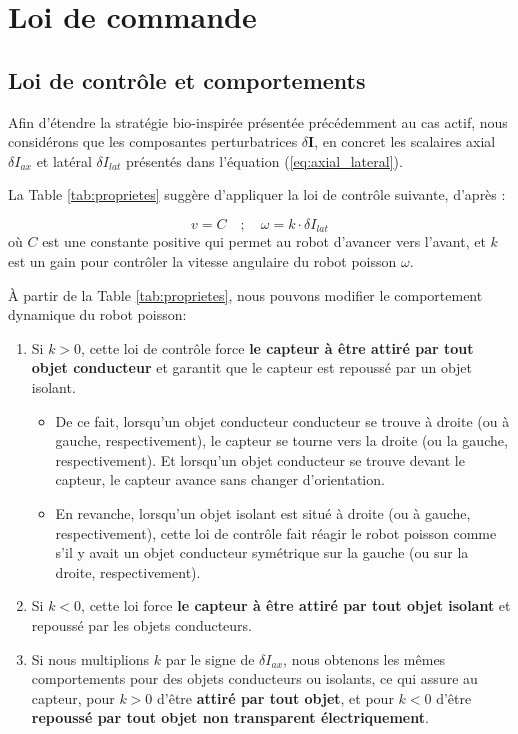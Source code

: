 \section{Loi de commande} 
\subsection{Loi de contrôle et comportements} \label{sec:controle}
Afin d'étendre la stratégie bio-inspirée présentée précédemment au cas actif, nous considérons que les composantes perturbatrices $\delta \mathbf{I}$, en concret les scalaires axial $\delta I_{ax}$ et latéral $\delta I_{lat}$ présentés dans l'équation (\ref{eq:axial_lateral}).

La Table \ref{tab:proprietes} suggère d'appliquer la loi de contrôle suivante, d'après \cite{Boyer2013}: 

\begin{equation}
    v = C \quad ; \quad \omega = k \cdot \delta I_{lat}
\end{equation}
où $C$ est une constante positive qui permet au robot d'avancer vers l'avant, et $k$ est un gain pour contrôler la vitesse angulaire du robot poisson $\omega$. 

À partir de la Table \ref{tab:proprietes}, nous pouvons modifier le comportement dynamique du robot poisson: 
\begin{enumerate} [label=(\alph*), ref=(3.1.\alph*)]
    \item Si $k > 0$, cette loi de contrôle force \textbf{le capteur à être attiré par tout objet conducteur} et garantit que le capteur est repoussé par un objet isolant. \label{item:a}
    \begin{itemize}
        \item De ce fait, lorsqu'un objet conducteur conducteur se trouve à droite (ou à gauche, respectivement), le capteur se tourne vers la droite (ou la gauche, respectivement). Et lorsqu'un objet conducteur se trouve devant le capteur, le capteur avance sans changer d'orientation.
        \item En revanche, lorsqu'un objet isolant est situé à droite (ou à gauche, respectivement), cette loi de contrôle fait réagir le robot poisson comme s'il y avait un objet conducteur symétrique sur la gauche (ou sur la droite, respectivement).
    \end{itemize}
    \item \label{item:b} Si $k < 0$, cette loi force \textbf{le capteur à être attiré par tout objet isolant} et repoussé par les objets conducteurs. 
    \vspace{0.5cm}
    \item Si nous multiplions $k$ par le signe de $\delta I_{ax}$, nous obtenons les mêmes comportements pour des objets conducteurs ou isolants, ce qui assure au capteur, pour $k > 0$ d'être \textbf{attiré par tout objet}, et pour $k < 0$ d'être \textbf{repoussé par tout objet non transparent électriquement}. \label{item:c}
\end{enumerate}

